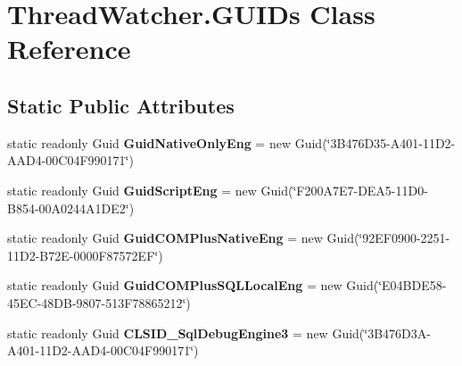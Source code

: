 \hypertarget{class_thread_watcher_1_1_g_u_i_ds}{\section{Thread\+Watcher.\+G\+U\+I\+Ds Class Reference}
\label{class_thread_watcher_1_1_g_u_i_ds}
}
\subsection*{Static Public Attributes}
\begin{DoxyCompactItemize}
\item 
\hypertarget{class_thread_watcher_1_1_g_u_i_ds_ab27e398641a4bc9c5ca019ed70240c78}{static readonly Guid {\bfseries Guid\+Native\+Only\+Eng} = new Guid(\char`\"{}3\+B476\+D35-\/\+A401-\/11\+D2-\/\+A\+A\+D4-\/00\+C04\+F990171\char`\"{})}\label{class_thread_watcher_1_1_g_u_i_ds_ab27e398641a4bc9c5ca019ed70240c78}

\item 
\hypertarget{class_thread_watcher_1_1_g_u_i_ds_a18009c7132e981413d3b6e44aa995392}{static readonly Guid {\bfseries Guid\+Script\+Eng} = new Guid(\char`\"{}F200\+A7\+E7-\/D\+E\+A5-\/11\+D0-\/\+B854-\/00\+A0244\+A1\+D\+E2\char`\"{})}\label{class_thread_watcher_1_1_g_u_i_ds_a18009c7132e981413d3b6e44aa995392}

\item 
\hypertarget{class_thread_watcher_1_1_g_u_i_ds_a0d016d444403c8df8ca51429590eecef}{static readonly Guid {\bfseries Guid\+C\+O\+M\+Plus\+Native\+Eng} = new Guid(\char`\"{}92\+E\+F0900-\/2251-\/11\+D2-\/\+B72\+E-\/0000\+F87572\+E\+F\char`\"{})}\label{class_thread_watcher_1_1_g_u_i_ds_a0d016d444403c8df8ca51429590eecef}

\item 
\hypertarget{class_thread_watcher_1_1_g_u_i_ds_aae3dd516ddb3a64ca1b9d9add11cbfbf}{static readonly Guid {\bfseries Guid\+C\+O\+M\+Plus\+S\+Q\+L\+Local\+Eng} = new Guid(\char`\"{}E04\+B\+D\+E58-\/45\+E\+C-\/48\+D\+B-\/9807-\/513\+F78865212\char`\"{})}\label{class_thread_watcher_1_1_g_u_i_ds_aae3dd516ddb3a64ca1b9d9add11cbfbf}

\item 
\hypertarget{class_thread_watcher_1_1_g_u_i_ds_ac01ae12066bd0927e1945ba4f97f6410}{static readonly Guid {\bfseries C\+L\+S\+I\+D\+\_\+\+Sql\+Debug\+Engine3} = new Guid(\char`\"{}3\+B476\+D3\+A-\/\+A401-\/11\+D2-\/\+A\+A\+D4-\/00\+C04\+F990171\char`\"{})}\label{class_thread_watcher_1_1_g_u_i_ds_ac01ae12066bd0927e1945ba4f97f6410}


\end{DoxyCompactItemize}
